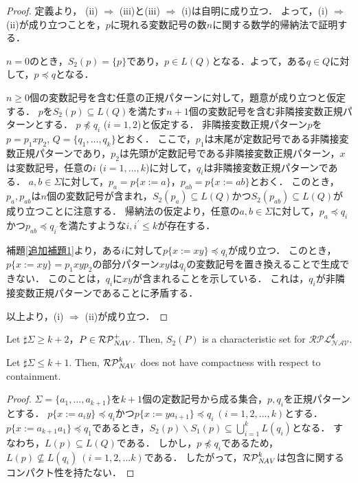 \begin{proof}
定義より，
(ii) $\Rightarrow$ (iii)と(iii) $\Rightarrow$ (i)は自明に成り立つ．
よって，(i) $\Rightarrow$ (ii)が成り立つことを，$p$に現れる変数記号の数$n$に関する数学的帰納法で証明する．

$n=0$のとき，$S_{2}(p)= \{ p \}$であり，$p \in L(Q)$となる．よって，ある$q \in Q$に対して，$p \preceq q$となる．

$n \ge 0$個の変数記号を含む任意の正規パターンに対して，題意が成り立つと仮定する．
$p$を$S_{2}(p) \subseteq L(Q)$を満たす$n+1$個の変数記号を含む非隣接変数正規パターンとする．
$p \not \preceq q_{i}$ ($i=1, 2$)と仮定する．
非隣接変数正規パターン$p$を$p=p_{1}xp_{2}$, $Q=\{ q_{1}, \ldots , q_{k} \}$とおく．
ここで，$p_{1}$は末尾が定数記号である非隣接変数正規パターンであり，$p_{2}$は先頭が定数記号である非隣接変数正規パターン，$x$は変数記号，任意の$i$ ($i=1, \ldots, k$)に対して，$q_{i}$は非隣接変数正規パターンである．
$a, b \in \Sigma$に対して，$p_{a}=p \{ x := a \}$，$p_{ab}=p \{ x := ab \}$とおく．
このとき，$p_{a}, p_{ab}$は$n$個の変数記号が含まれ，$S_{2}(p_{a}) \subseteq L(Q)$かつ$S_{2}(p_{ab}) \subseteq L(Q)$が成り立つことに注意する．
帰納法の仮定より，任意の$a, b \in \Sigma$に対して，$p_{a} \preceq q_{i}$かつ$p_{ab} \preceq q_{i^{\prime}}$を満たすような$i, i^{\prime} \le k$が存在する．

補題\ref{追加補題1}より，ある$i$に対して$p \{ x:=xy \} \preceq q_{i}$が成り立つ．
このとき，$p \{ x:=xy \} =p_{1}xyp_{2}$の部分パターン$xy$は$q_{i}$の変数記号を置き換えることで生成できない．
このことは，$q_{i}$に$xy$が含まれることを示している．
これは，$q_{i}$が非隣接変数正規パターンであることに矛盾する．

以上より，(i) $\Rightarrow$ (ii)が成り立つ．
\end{proof}

\begin{col}
Let $\sharp\Sigma \ge k+2$，$P \in \mathcal{RP}^{+}_{N\!AV}$.
Then, $S_{2}(P)$ is a characteristic set for $\mathcal{RPL^{\mbox{$k$}}_{NAV}}$.
\end{col}

\begin{lem}\label{Case_k+2}\label{k+2のとき}
Let $\sharp\Sigma \le k+1$.
Then, $\mathcal{RP}^{k}_{N\!AV}$ does not have compactness with respect to containment.
\end{lem}
\begin{proof}
$\Sigma = \{ a_{1}, \ldots , a_{k+1} \}$を$k+1$個の定数記号から成る集合，$p, q_{i}$を正規パターンとする．
$p \{ x := a_{i}y \} \preceq q_{i}$かつ$p \{ x := ya_{i+1} \} \preceq q_{i}~(i=1,2, \ldots ,k)$とする．
$p \{ x:= a_{k+1}a_{1} \} \preceq q_{1}$であるとき，$S_{2}(p) \backslash S_{1}(p) \subseteq \bigcup^{k}_{i=1} L(q_{i})$となる． 
すなわち，$L(p) \subseteq L(Q)$である．
しかし，$p \not \preceq q_{i}$であるため，$L(p) \not \subseteq L(q_{i})~(i=1,2, \ldots k)$である．
したがって，$\mathcal{RP}^{k}_{N\!AV}$は包含に関するコンパクト性を持たない．
\end{proof}

